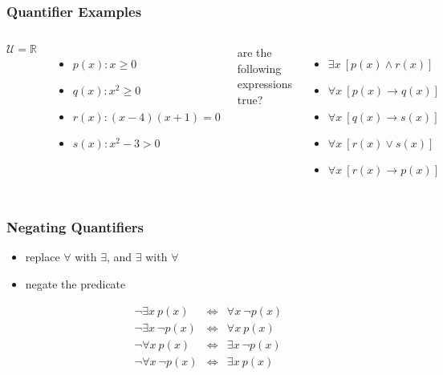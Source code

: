 \documentclass[dvipsnames]{beamer}
\begin{document}
\begin{frame}
  \frametitle{Quantifier Examples}

  \begin{example}
    \begin{columns}[t]
      $\mathcal{U} = \mathbb{R}$\\

      \begin{itemize}
        \item $p(x): x \geq 0$
        \item $q(x): x^2 \geq 0$
        \item $r(x): (x-4) (x+1) = 0$
        \item $s(x): x^2 -3 > 0$
      \end{itemize}

      are the following expressions true?

      \begin{itemize}
        \pause
        \item $\exists x~[p(x) \wedge r(x)]$

        \pause
        \item $\forall x~[p(x) \rightarrow q(x)]$

        \pause
        \item $\forall x~[q(x) \rightarrow s(x)]$

        \pause
        \item $\forall x~[r(x) \vee s(x)]$

        \pause
        \item $\forall x~[r(x) \rightarrow p(x)]$
      \end{itemize}
    \end{columns}
  \end{example}
\end{frame}

\begin{frame}
  \frametitle{Negating Quantifiers}

  \begin{itemize}
    \item replace $\forall$ with $\exists$, and $\exists$ with $\forall$
    \item negate the predicate
  \end{itemize}

  \pause
  \begin{eqnarray*}
    \neg \exists x~p(x)      & \Leftrightarrow & \forall x~\neg p(x)\\
    \neg \exists x~\neg p(x) & \Leftrightarrow & \forall x~p(x)\\
    \neg \forall x~p(x)      & \Leftrightarrow & \exists x~\neg p(x)\\
    \neg \forall x~\neg p(x) & \Leftrightarrow & \exists x~p(x)
  \end{eqnarray*}
\end{frame}
\end{document}
